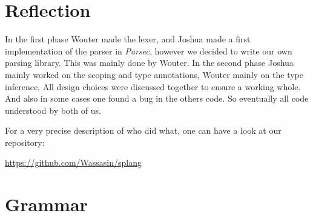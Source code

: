 \documentclass[14pt]{amsart}
\begin{document}
\section{Reflection}
In the first phase Wouter made the lexer, and Joshua made a first implementation of the parser in \emph{Parsec}, however we decided to write our own parsing library. This was mainly done by Wouter. In the second phase Joshua mainly worked on the scoping and type annotations, Wouter mainly on the type inference. All design choices were discussed together to ensure a working whole. And also in some cases one found a bug in the others code. So eventually all code understood by both of us.

For a very precise description of who did what, one can have a look at our repository:

\url{https://github.com/Wassasin/splang}

\newpage
\appendix
\section{Grammar}

\newcommand{\tok}[1]{`\texttt{#1}'}
\newcommand{\I}{\hspace{0.1cm}$\mid$\hspace{0.2cm}}
\end{document}
